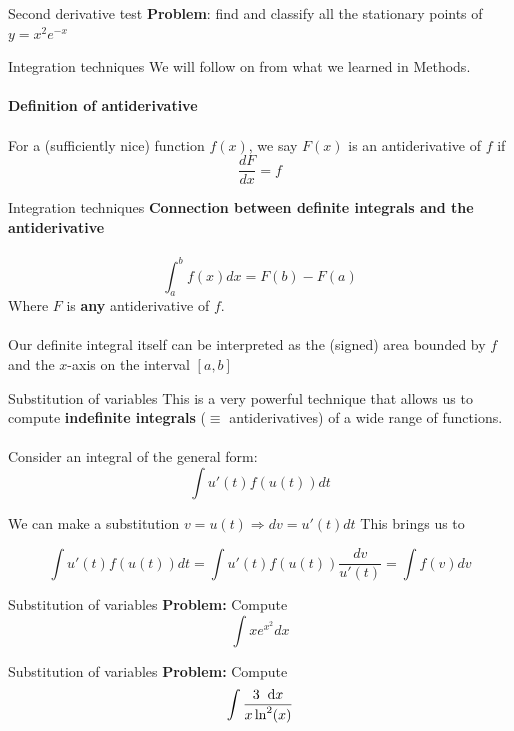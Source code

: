 \documentclass{beamer}
\renewcommand{\d}{\hspace{0.2cm}\text{d}}
\begin{document}
\begin{frame}{Second derivative test}
	\textbf{Problem}: find and classify all the stationary points of $y = x^2 e^{-x}$
	\vspace{5cm}
\end{frame}

\begin{frame}{Integration techniques}
	We will follow on from what we learned in Methods.\\~\\
	\textbf{Definition of antiderivative}\\~\\
	For a (sufficiently nice) function $f(x)$, we say $F(x)$ is an antiderivative of $f$ if
	$$\dfrac{dF}{dx} = f$$
\end{frame}

\begin{frame}{Integration techniques}
	\textbf{Connection between definite integrals and the antiderivative}\\~\\
	$$\int_a^b f(x) dx = F(b) - F(a)$$
	Where $F$ is \textbf{any} antiderivative of $f$.\\~\\
	Our definite integral itself can be interpreted as the (signed) area bounded by $f$ and the $x$-axis on the interval $[a, b]$
\end{frame}

\begin{frame}{Substitution of variables}
	This is a very powerful technique that allows us to compute \textbf{indefinite integrals} ($\equiv$ antiderivatives) of a wide range of functions.
	\\~\\
	Consider an integral of the general form:
	$$\int u'(t) f(u(t)) dt$$
	
	We can make a substitution $v = u(t) \Rightarrow dv = u'(t) dt$
	This brings us to
	
	$$\int u'(t) f(u(t)) dt = \int u'(t) f(u(t)) \dfrac{dv}{u'(t)} = \int f(v) dv$$
\end{frame}

\begin{frame}{Substitution of variables}
	\textbf{Problem: } Compute $$\int x e^{x^2} dx$$
	\vspace{5cm}
\end{frame}

\begin{frame}{Substitution of variables}
	\textbf{Problem: } Compute $$\int \dfrac{3 \d x}{x \ln^2(x)}$$
	\vspace{5cm}
\end{frame}
\end{document}
